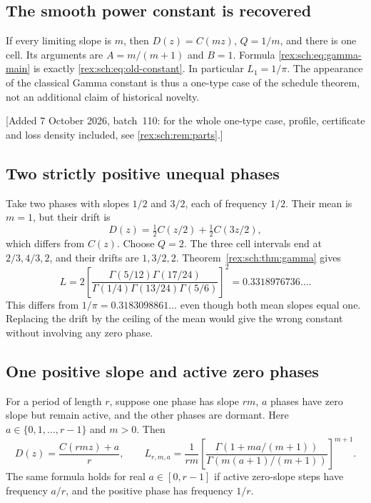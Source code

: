 \subsection{The smooth power constant is recovered}

If every limiting slope is $m$, then $D(z)=C(mz)$, $Q=1/m$,
and there is one cell. Its arguments are $A=m/(m+1)$ and $B=1$.
Formula \eqref{rex:sch:eq:gamma-main} is exactly \eqref{rex:sch:eq:old-constant}.
In particular $L_1=1/\pi$. The appearance of the classical Gamma
constant is thus a one-type case of the schedule theorem, not an
additional claim of historical novelty.

[Added 7 October 2026, batch~110: for the whole one-type case, profile,
certificate and loss density included, see \cref{rex:sch:rem:parts}.]

\subsection{Two strictly positive unequal phases}

Take two phases with slopes $1/2$ and $3/2$, each of frequency $1/2$.
Their mean is $m=1$, but their drift is
\[
 D(z)=\tfrac12C(z/2)+\tfrac12C(3z/2),
\]
which differs from $C(z)$. Choose $Q=2$. The three cell intervals
end at $2/3,4/3,2$, and their drifts are $1,3/2,2$.
Theorem~\ref{rex:sch:thm:gamma} gives
\begin{equation}\label{rex:sch:eq:unequal-gamma}
 L=2\left[
 \frac{\Gamma(5/12)\Gamma(17/24)}
 {\Gamma(1/4)\Gamma(13/24)\Gamma(5/6)}
 \right]^2
 =0.3318976736\ldots.
\end{equation}
This differs from $1/\pi=0.3183098861\ldots$ even though both mean
slopes equal one. Replacing the drift by the ceiling of the mean
would give the wrong constant without involving any zero phase.

\subsection{One positive slope and active zero phases}

\begin{corollary}\label{rex:sch:cor:one-positive}
For a period of length $r$, suppose one phase has slope $rm$,
$a$ phases have zero slope but remain active, and the other phases
are dormant. Here $a\in\{0,1,\ldots,r-1\}$ and $m>0$. Then
\begin{equation}\label{rex:sch:eq:one-positive}
 D(z)=\frac{C(rmz)+a}{r},\qquad
 L_{r,m,a}=\frac1{rm}
 \left[
 \frac{\Gamma(1+ma/(m+1))}
 {\Gamma(m(a+1)/(m+1))}
 \right]^{m+1}.
\end{equation}
The same formula holds for real $a\in[0,r-1]$ if active zero-slope
steps have frequency $a/r$, and the positive phase has frequency
$1/r$.
\end{corollary}

